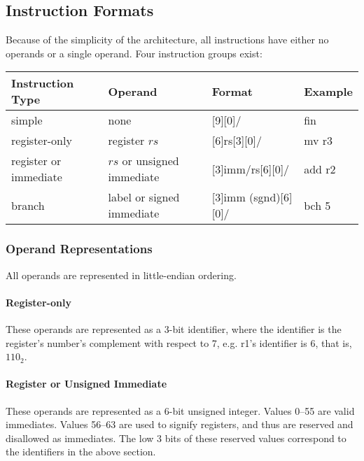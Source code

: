 \documentclass{article}
\begin{document}
    \subsection{Instruction Formats}

    Because of the simplicity of the architecture, all instructions have either
    no operands or a single operand. Four instruction groups exist: \\
    {\tabulinesep=1.2mm
    \begin{tabu}{ | l | p{3cm} | l | l | }
        \hline
        Instruction Type & Operand & Format & Example \\ \hline
        simple & none & {\centering {}[9]{}[0]/ \par} & fin \\ \hline
        register-only & register $rs$ & {\centering {}[6]{rs}[3]{}[0]/} & mv r3 \\ \hline
        register or immediate & $rs$ or unsigned immediate & {\centering {}[3]{imm/rs}[6]{}[0]/} & add r2 \\ \hline
        branch & label or signed immediate & {\centering {}[3]{imm (sgnd)}[6]{}[0]/} & bch 5 \\
        \hline
    \end{tabu}}

    \subsubsection{Operand Representations}

    All operands are represented in little-endian ordering.

    \paragraph{Register-only}
    These operands are represented as a 3-bit identifier, where the identifier
    is the register's number's complement with respect to 7, e.g. r1's
    identifier is 6, that is, $110_2$.

    \paragraph{Register or Unsigned Immediate}
    These operands are represented as a 6-bit unsigned integer. Values
    \numrange{0}{55} are valid immediates. Values \numrange{56}{63} are used to
    signify registers, and thus are reserved and disallowed as
    immediates. The low 3 bits of these reserved values correspond to the
    identifiers in the above section.
\end{document}
